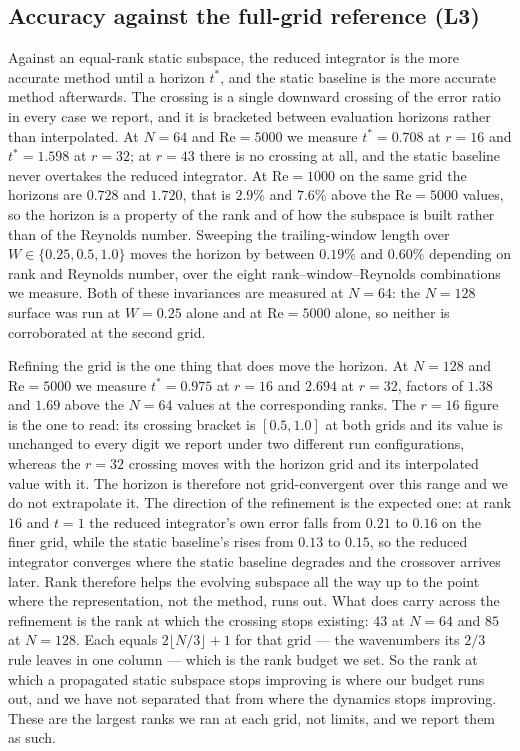 \subsection{Accuracy against the full-grid reference (L3)}
\label{sec:res-error}

Against an equal-rank static subspace, the reduced integrator is the more accurate
method until a horizon $t^\ast$, and the static baseline is the more accurate method
afterwards. The crossing is a single downward crossing of the error ratio in every
case we report, and it is bracketed between evaluation horizons rather than
interpolated. At $N=64$ and $\mathrm{Re}=5000$ we measure $t^\ast = 0.708$ at $r=16$
and $t^\ast = 1.598$ at $r=32$; at $r=43$ there is no crossing at all, and the static
baseline never overtakes the reduced integrator. At $\mathrm{Re}=1000$ on the same
grid the horizons are $0.728$ and $1.720$, that is $2.9\%$ and $7.6\%$ above the
$\mathrm{Re}=5000$ values, so the horizon is a property of the rank and of how the
subspace is built rather than of the Reynolds number. Sweeping the trailing-window
length over $W \in \{0.25, 0.5, 1.0\}$ moves the horizon by between $0.19\%$ and
$0.60\%$ depending on rank and Reynolds number, over the eight rank--window--Reynolds
combinations we measure. Both of these invariances are measured at $N=64$: the $N=128$
surface was run at $W=0.25$ alone and at $\mathrm{Re}=5000$ alone, so neither is
corroborated at the second grid.

Refining the grid is the one thing that does move the horizon. At $N=128$ and
$\mathrm{Re}=5000$ we measure $t^\ast = 0.975$ at $r=16$ and $2.694$ at $r=32$, factors of $1.38$ and $1.69$ above the $N=64$ values at the corresponding ranks. The $r=16$ figure is the one to read: its crossing bracket is $[0.5,1.0]$ at both grids and its value is unchanged to every digit we report under two different run configurations, whereas the $r=32$ crossing moves with the horizon grid and its interpolated value with it. The horizon is therefore not grid-convergent over this range and
we do not extrapolate it. The direction of the refinement is the expected one: at
rank $16$ and $t = 1$ the reduced integrator's own error falls from $0.21$ to
$0.16$ on the finer grid, while the static baseline's rises from $0.13$ to
$0.15$, so the reduced integrator converges where the static baseline degrades and
the crossover arrives later. Rank therefore helps the evolving subspace all the way
up to the point where the representation, not the method, runs out. What does carry across the refinement is the rank at which
the crossing stops existing: $43$ at $N=64$ and $85$ at $N=128$. Each equals $2\lfloor N/3\rfloor+1$ for that grid --- the wavenumbers its $2/3$ rule leaves in one column --- which is the rank budget we set. So the rank at which a propagated static subspace stops improving is where our budget runs out, and we have not separated that from where the dynamics stops improving. These are the largest ranks we ran at each grid, not limits, and we
report them as such.

